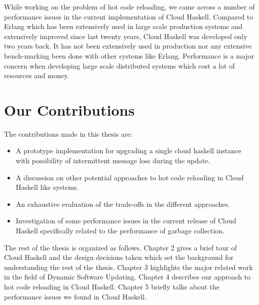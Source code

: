 While working on the problem of hot code reloading, we came across a
number of performance issues in the current implementation of Cloud
Haskell. Compared to Erlang which has been extensively used in large
scale production systems and extensively improved since last twenty
years, Cloud Haskell was developed only two years back. It has not
been extensively used in production nor any extensive bench-marking
been done with other systems like Erlang. Performance is a major
concern when developing large scale distributed systems which cost a
lot of resources and money.

\section{Our Contributions}

The contributions made in this thesis are:
\begin{itemize}
\item A prototype implementation for upgrading a single cloud haskell
  instance with possibility of intermittent message loss during the
  update.
\item A discussion on other potential approaches to hot code reloading
  in Cloud Haskell like systems.
\item An exhaustive evaluation of the trade-offs in the different
  approaches.
\item Investigation of some performance issues in the current release
  of Cloud Haskell specifically related to the performance of garbage
  collection.
\end{itemize}

The rest of the thesis is organized as follows. Chapter 2 gives a
brief tour of Cloud Haskell and the design decisions taken which set
the background for understanding the rest of the thesis. Chapter 3
highlights the major related work in the field of Dynamic Software
Updating. Chapter 4 describes our approach to hot code reloading in
Cloud Haskell. Chapter 5 briefly talks about the performance issues we
found in Cloud Haskell.